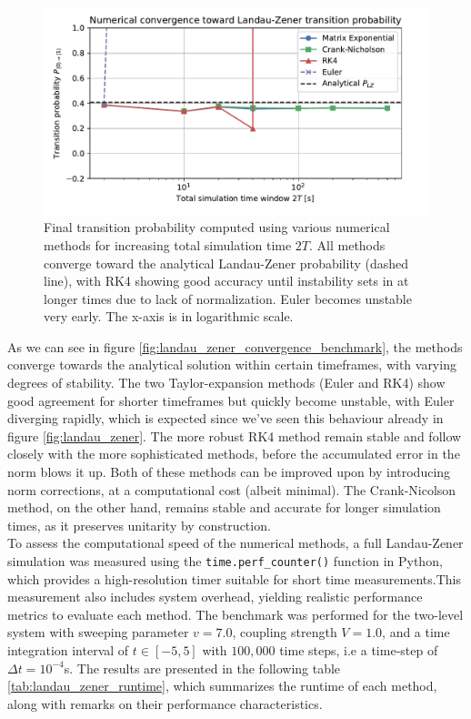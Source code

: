 \documentclass{subfiles}
\begin{document}
\begin{figure}[h!]
\centering
\includegraphics[width=1.0\textwidth]{figs/landau_zener_convergence_benchmark.pdf}
\caption{Final transition probability computed using various numerical methods for increasing total simulation time $
2T$. All methods converge toward the analytical Landau-Zener probability (dashed line), with RK4 showing good accuracy until instability sets in at longer times due to lack of normalization. Euler becomes unstable very early. The x-axis is in logarithmic scale.}
\end{figure}

As we can see in figure \eqref{fig:landau_zener_convergence_benchmark}, the methods converge towards the analytical solution within certain timeframes, with varying degrees of stability. The two Taylor-expansion methods (Euler and RK4) show good agreement for shorter timeframes but quickly become unstable, with Euler diverging rapidly, which is expected since we've seen this behaviour already in figure \eqref{fig:landau_zener}. The more robust RK4 method remain stable and follow closely with the more sophisticated methods, before the accumulated error in the norm blows it up. Both of these methods can be improved upon by introducing norm corrections, at a computational cost (albeit minimal). The Crank-Nicolson method, on the other hand, remains stable and accurate for longer simulation times, as it preserves unitarity by construction. 
\\ 

To assess the computational speed of the numerical methods, a full Landau-Zener simulation was measured using the \texttt{time.perf\_counter()} function in Python, which provides a high-resolution timer suitable for short time measurements.This measurement also includes system overhead, yielding realistic performance metrics to evaluate each method. 
The benchmark was performed for the two-level system with sweeping parameter $v=7.0$, coupling strength $V=1.0$, and a time integration interval of $t \in [-5, 5]$ with $100{,}000$ time steps, i.e a time-step of $\Delta t = 10^{-4}$s. The results are presented in the following table \eqref{tab:landau_zener_runtime}, which summarizes the runtime of each method, along with remarks on their performance characteristics.
\end{document}
